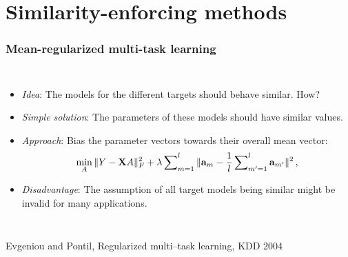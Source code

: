 \documentclass[11pt,compress,t,notes=noshow, xcolor=table]{beamer}
\newcommand{\ba}{\mathbf{a}}
\begin{document}
\section{Similarity-enforcing methods}

\begin{frame}[t]
	\frametitle{Mean-regularized multi-task learning}
	
	\vspace{0.2cm}
	\begin{columns}
		\column{5cm}
		\footnotesize{
			\begin{itemize} 
%				
				\item \emph{Idea}: The models for the different targets should behave similar. How?
%				
				\item \emph{Simple solution}: The parameters of these models should have similar values.
%				
				\item \emph{Approach}: Bias the parameter vectors towards their overall mean vector:
					\vspace{0.2cm}
				\begin{equation*}
					\label{eq:meanreg}
					\min_A \|Y - \Xmat A \|^2_F + \lambda \sum\nolimits_{m=1}^l \|\ba_m - \frac{1}{l} \sum\nolimits_{m'=1}^l \ba_{m'} \|^2 \, ,
				\end{equation*}
%				
				\item \emph{Disadvantage}: The assumption of all target models being similar might be invalid for many applications. \lz
			\end{itemize}
		}
		\column{4.5cm}
		
%	
	\end{columns}

{\tiny Evgeniou and Pontil, Regularized multi--task learning, KDD 2004}
\end{frame}
\end{document}
